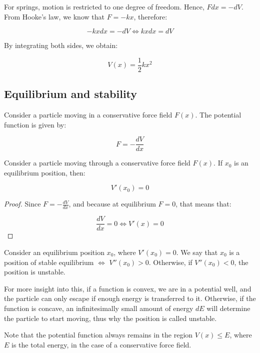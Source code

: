 \documentclass[12pt]{article}
\begin{document}
\begin{example}[Springs]
    For springs, motion is restricted to one degree of freedom. Hence, $Fdx = -dV$. From Hooke's law, we know that $F = -kx$, therefore:

    \[ -kxdx = -dV \Leftrightarrow kxdx = dV \]

    By integrating both sides, we obtain: 

    \[ V(x) = \frac{1}{2}kx^2 \]
\end{example}

\subsection{Equilibrium and stability}

Consider a particle moving in a conservative force field $F(x)$. The potential  function is given by:

\[ F = -\frac{dV}{dx} \]

\begin{theorem}[Equilibrium]
    Consider a particle moving through a conservative force field $F(x)$. If $x_0$ is an equilibrium position, then:

    \[ V'(x_0) = 0 \]
\end{theorem}

\begin{proof}
    Since $F = -\frac{dV}{dx}$, and because at equilibrium $F = 0$, that means that:

    \[ \frac{dV}{dx} = 0 \Leftrightarrow V'(x) = 0 \]
\end{proof}

\begin{theorem}[Stability]
    Consider an equilibrium position $x_0$, where $V'(x_0) = 0$. We say that $x_0$ is a position of stable equilibrium $\iff$ $V''(x_0) > 0$. Otherwise, if $V''(x_0) < 0$, the position is unstable.
\end{theorem}

For more insight into this, if a function is convex, we are in a potential well, and the particle can only escape if enough energy is transferred to it. Otherwise, if the function is concave, an infinitesimally small amount of energy $dE$ will determine the particle to start moving, thus why the position is called unstable.

Note that the potential function always remains in the region $V(x) \leq E$, where $E$ is the total energy, in the case of a conservative force field.

\newpage
\end{document}
